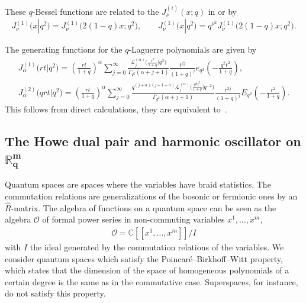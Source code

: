 \documentclass[11pt]{article}
\newcommand{\mR}{\mathbb{R}}
\newcommand{\mC}{\mathbb{C}}
\newcommand{\cL}{\mathcal{L}}
\newcommand{\cO}{\mathcal{O}}
\numberwithin{equation}{section}
\begin{document}
These $q$-Bessel functions are related to the $J^{(i)}_\nu(x;q)$ in \cite[(1.13) and (1.17)]{MR0649849}  or \cite[Exercise~1.24]{MR1052153} by
\begin{gather*}
J^{(1)}_\nu\big(x|q^2\big)=J^{(1)}_\nu\big({2(1-q)}x;q^2\big),\qquad J^{(1)}_\nu\big(x|q^2\big)=q^{\nu^2}J^{(1)}_\nu\big(2(1-q)x;q^2\big).
\end{gather*}



The generating functions for the $q$-Laguerre polynomials are given by
\begin{gather}
\label{BesselLag1}
J_\alpha^{(1)}\big(rt|q^2\big) = \left(\frac{rt}{1+q}\right)^{\alpha}\sum_{j=0}^\infty\frac{\cL_j^{(\alpha)}\big(\frac{r^2}{1+q}|q^2\big)}{\Gamma_{q^2}(\alpha+j+1)}
\frac{t^{2j}}{(1+q)^j}e_{q^2}\left(-\frac{q^2t^2}{1+q}\right),\\
\label{BesselLag2}
J_\alpha^{(2)}\big(qrt|q^2\big) = \left(\frac{rt}{1+q}\right)^{\alpha}\sum_{j=0}^\infty\frac{q^{(j+\alpha)(j+1+\alpha)}\cL_j^{(\alpha)}
\big(\frac{q^2t^2}{1+q}|q^{-2}\big)}{\Gamma_{q^2}(\alpha+j+1)}\frac{r^{2j}}{(1+q)^j}E_{q^2}\left(-\frac{r^2}{1+q}\right).
\end{gather}
This follows from direct calculations, they are equivalent to~\cite[formulas~(3.20.11) and (3.21.13)]{Koekoek}.



\subsection[The Howe dual pair and harmonic oscillator on $\mR^m_q$]{The Howe dual pair and harmonic oscillator on $\boldsymbol{\mR^m_q}$}

Quantum spaces are spaces where the variables have braid statistics. The commutation relations are generalizations of the bosonic or fermionic ones by an $\hat{R}$-matrix. The algebra of functions on a quantum space can be seen as the algebra $\cO$ of formal power series in non-commuting variables $x^1,\dots,x^m$,
\begin{gather*}
\cO = \mC[[x^1,\dots,x^m]]/I
\end{gather*}
with $I$ the ideal generated by the commutation relations of the variables. We consider quantum spaces which satisfy the Poincar\'e--Birkhof\/f--Witt property, which states that the dimension of the space of homogeneous polynomials of a certain degree is the same as in the commutative case. Superspaces, for instance, do not satisfy this property.
\end{document}
